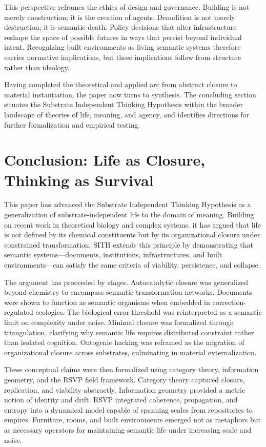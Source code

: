 \documentclass[11pt,oneside]{article}
\begin{document}
This perspective reframes the ethics of design and governance. Building is not merely construction; it is the creation of agents. Demolition is not merely destruction; it is semantic death. Policy decisions that alter infrastructure reshape the space of possible futures in ways that persist beyond individual intent. Recognizing built environments as living semantic systems therefore carries normative implications, but these implications follow from structure rather than ideology.

Having completed the theoretical and applied arc from abstract closure to material instantiation, the paper now turns to synthesis. The concluding section situates the Substrate Independent Thinking Hypothesis within the broader landscape of theories of life, meaning, and agency, and identifies directions for further formalization and empirical testing.

\section{Conclusion: Life as Closure, Thinking as Survival}

This paper has advanced the Substrate Independent Thinking Hypothesis as a generalization of substrate-independent life to the domain of meaning. Building on recent work in theoretical biology and complex systems, it has argued that life is not defined by its chemical constituents but by its organizational closure under constrained transformation. SITH extends this principle by demonstrating that semantic systems—documents, institutions, infrastructures, and built environments—can satisfy the same criteria of viability, persistence, and collapse.

The argument has proceeded by stages. Autocatalytic closure was generalized beyond chemistry to encompass semantic transformation networks. Documents were shown to function as semantic organisms when embedded in correction-regulated ecologies. The biological error threshold was reinterpreted as a semantic limit on complexity under noise. Minimal closure was formalized through triangulation, clarifying why semantic life requires distributed constraint rather than isolated cognition. Ontogenic hacking was reframed as the migration of organizational closure across substrates, culminating in material externalization.

These conceptual claims were then formalized using category theory, information geometry, and the RSVP field framework. Category theory captured closure, replication, and viability abstractly. Information geometry provided a metric notion of identity and drift. RSVP integrated coherence, propagation, and entropy into a dynamical model capable of spanning scales from repositories to empires. Furniture, rooms, and built environments emerged not as metaphors but as necessary operators for maintaining semantic life under increasing scale and noise.
\end{document}
